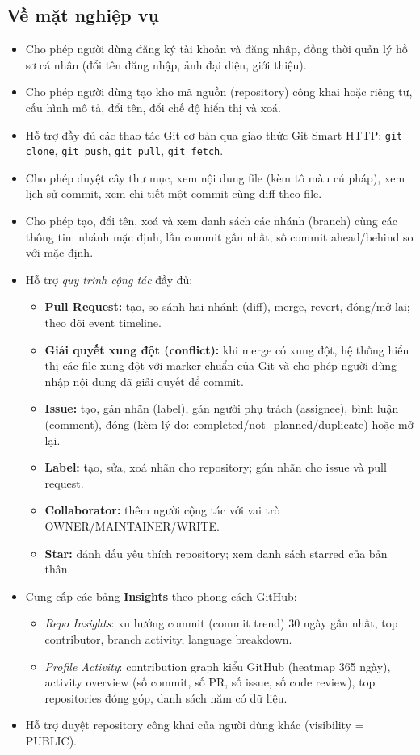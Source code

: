 \subsection{Về mặt nghiệp vụ}
\begin{itemize}
\item Cho phép người dùng đăng ký tài khoản và đăng nhập, đồng thời quản lý hồ sơ cá nhân (đổi tên đăng nhập, ảnh đại diện, giới thiệu).
\item Cho phép người dùng tạo kho mã nguồn (repository) công khai hoặc riêng tư, cấu hình mô tả, đổi tên, đổi chế độ hiển thị và xoá.
\item Hỗ trợ đầy đủ các thao tác Git cơ bản qua giao thức Git Smart HTTP: \texttt{git clone}, \texttt{git push}, \texttt{git pull}, \texttt{git fetch}.
\item Cho phép duyệt cây thư mục, xem nội dung file (kèm tô màu cú pháp), xem lịch sử commit, xem chi tiết một commit cùng diff theo file.
\item Cho phép tạo, đổi tên, xoá và xem danh sách các nhánh (branch) cùng các thông tin: nhánh mặc định, lần commit gần nhất, số commit ahead/behind so với mặc định.
\item Hỗ trợ \textit{quy trình cộng tác} đầy đủ:
  \begin{itemize}
  \item \textbf{Pull Request:} tạo, so sánh hai nhánh (diff), merge, revert, đóng/mở lại; theo dõi event timeline.
  \item \textbf{Giải quyết xung đột (conflict):} khi merge có xung đột, hệ thống hiển thị các file xung đột với marker chuẩn của Git và cho phép người dùng nhập nội dung đã giải quyết để commit.
  \item \textbf{Issue:} tạo, gán nhãn (label), gán người phụ trách (assignee), bình luận (comment), đóng (kèm lý do: completed/not\_planned/duplicate) hoặc mở lại.
  \item \textbf{Label:} tạo, sửa, xoá nhãn cho repository; gán nhãn cho issue và pull request.
  \item \textbf{Collaborator:} thêm người cộng tác với vai trò OWNER/MAINTAINER/WRITE.
  \item \textbf{Star:} đánh dấu yêu thích repository; xem danh sách starred của bản thân.
  \end{itemize}
\item Cung cấp các bảng \textbf{Insights} theo phong cách GitHub:
  \begin{itemize}
  \item \textit{Repo Insights}: xu hướng commit (commit trend) 30 ngày gần nhất, top contributor, branch activity, language breakdown.
  \item \textit{Profile Activity}: contribution graph kiểu GitHub (heatmap 365 ngày), activity overview (số commit, số PR, số issue, số code review), top repositories đóng góp, danh sách năm có dữ liệu.
  \end{itemize}
\item Hỗ trợ duyệt repository công khai của người dùng khác (visibility = PUBLIC).
\end{itemize}

